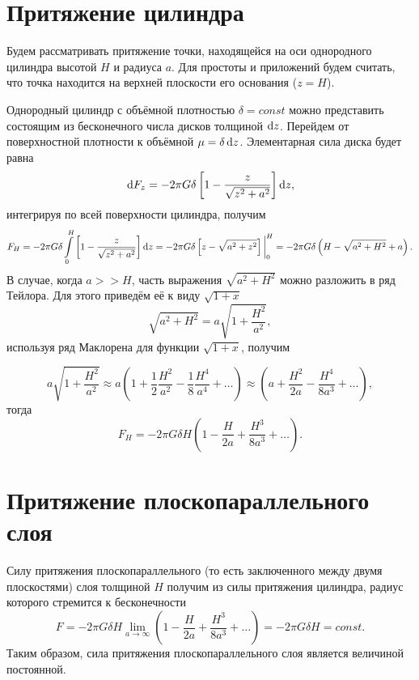 \documentclass[11pt, a4paper]{article}
\theoremstyle{plain}
\theoremstyle{definition}
\theoremstyle{remark}
\begin{document}
\section{Притяжение цилиндра}
Будем рассматривать притяжение точки, находящейся на оси однородного цилиндра высотой $H$ и радиуса $a$. Для простоты и приложений будем считать, что точка находится на верхней плоскости его основания ($z = H$).

Однородный цилиндр с объёмной плотностью $\delta=const$ можно представить состоящим из бесконечного числа дисков толщиной $\dif z$. Перейдем от поверхностной плотности к объёмной $\mu = \delta \dif z$. Элементарная сила диска будет равна
\begin{equation*}
    \dif F_z = -2\pi G\delta\left[ 1 - \dfrac{z}{\sqrt{z^2 + a^2}}\right] \dif z,
\end{equation*}
интегрируя по всей поверхности цилиндра, получим
\begin{equation*}
    F_H = -2\pi G\delta\int\limits_{0}^{H}\left[ 1 - \dfrac{z}{\sqrt{z^2 + a^2}}\right] \dif z =
    -2\pi G\delta \left[ z - \sqrt{a^2 + z^2} \right] \bigg|_0^{H} =
    -2\pi G\delta\left( H - \sqrt{a^2 + H^2} + a \right).
\end{equation*}
В случае, когда $a >> H$, часть выражения $\sqrt{a^2 + H^2}$ можно разложить в ряд Тейлора. Для этого приведём её к виду $\sqrt{1 + x}$
\begin{equation*}
    \sqrt{a^2 + H^2} = a\sqrt{1 + \dfrac{H^2}{a^2}},
\end{equation*}
используя ряд Маклорена для функции $\sqrt{1 + x}$, получим

\begin{equation*}
    a\sqrt{1 + \dfrac{H^2}{a^2}} \approx
    a\left(1 + \dfrac{1}{2}\dfrac{H^2}{a^2} - \dfrac{1}{8} \dfrac{H^4}{a^4} + \dots\right) \approx 
    \left(a + \dfrac{H^2}{2a} - \dfrac{H^4}{8a^3} + \dots\right),
\end{equation*}
тогда
\begin{equation*}
    F_H = 
    -2\pi G\delta H\left( 1 - \dfrac{H}{2a} + \dfrac{H^3}{8a^3} + \dots \right).
\end{equation*}

\section{Притяжение плоскопараллельного слоя}
Силу притяжения плоскопараллельного (то есть заключенного между двумя плоскостями) слоя толщиной $H$
получим из силы притяжения цилиндра, радиус которого стремится к бесконечности
\begin{equation*}
    F = 
    -2\pi G\delta H\lim\limits_{a\to\infty}\left(  1 - \dfrac{H}{2a} + \dfrac{H^3}{8a^3} + \dots \right) = 
    -2\pi G\delta H = const.
\end{equation*}
Таким образом, сила притяжения плоскопараллельного слоя является величиной
постоянной. 
\end{document}
